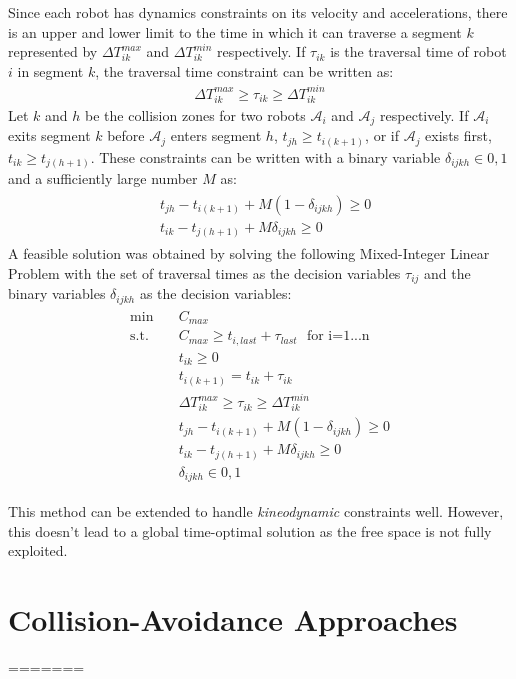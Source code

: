 Since each robot has dynamics constraints on its velocity and accelerations, there is an upper and lower limit to the time in which it can traverse a segment $k$ represented by $\Delta T_{ik}^{max}$ and $\Delta T_{ik}^{min}$ respectively. If $\tau_{ik}$ is the traversal time of robot $i$ in segment $k$, the traversal time constraint can be written as:
\begin{align}
\Delta T_{ik}^{max}\geq \tau_{ik} \geq \Delta T_{ik}^{min}
\end{align}
Let $k$ and $h$ be the collision zones for two robots $\mathcal{A}_i$ and $\mathcal{A}_j$ respectively. If $\mathcal{A}_i$ exits segment $k$ before $\mathcal{A}_j$ enters segment $h$, $t_{jh}\geq t_{i(k+1)}$, or if $\mathcal{A}_j$ exists first, $t_{ik}\geq t_{j(h+1)}$. These constraints can be written with a binary variable $\delta_{ijkh}\in {0,1}$ and a sufficiently large number $M$ as:
\begin{align}
\begin{split}
&t_{jh}-t_{i(k+1)} + M(1-\delta_{ijkh})\geq 0\\
&t_{ik}-t_{j(h+1)}+M\delta_{ijkh} \geq 0
\end{split}
\end{align}
A feasible solution was obtained by solving the following Mixed-Integer Linear Problem with the set of traversal times as the decision variables $\tau_{ij}$ and the binary variables $\delta_{ijkh}$ as the decision variables:
\begin{align}
\begin{split}
\min \quad &C_{max}\\
\text{s.t.} \quad &C_{max}\geq t_{i,last} + \tau_{last}~~~\text{for i=1...n}\\
&t_{ik}\geq 0\\
&t_{i(k+1)}=t_{ik}+\tau_{ik}\\
&\Delta T_{ik}^{max}\geq \tau_{ik} \geq \Delta T_{ik}^{min}\\
&t_{jh}-t_{i(k+1)} + M(1-\delta_{ijkh})\geq 0\\
&t_{ik}-t_{j(h+1)}+M\delta_{ijkh} \geq 0\\
&\delta_{ijkh}\in {0,1}
\end{split}
\end{align}

This method can be extended to handle \textit{kineodynamic} constraints well. However, this doesn't lead to a global time-optimal solution as the free space is not fully exploited.
\section{Collision-Avoidance Approaches}
=======

